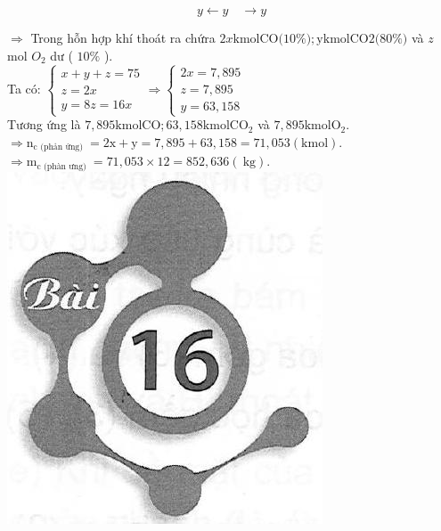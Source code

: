 \documentclass[10pt]{article}
\begin{document}
$$
y \leftarrow y \quad \rightarrow y
$$

$\Rightarrow$ Trong hỗn hợp khí thoát ra chứra $2 x \mathrm{kmol} \mathrm{CO} \mathrm{(10} \mathrm{\%);} \mathrm{y} \mathrm{kmol} \mathrm{CO2} \mathrm{(80} \mathrm{\%)}$ và $z$ mol $O_{2}$ dư ( $10 \%$ ).\\
Ta có: $\left\{\begin{array}{l}x+y+z=75 \\ z=2 x \\ y=8 z=16 x\end{array} \Rightarrow\left\{\begin{array}{l}2 x=7,895 \\ z=7,895 \\ y=63,158\end{array}\right.\right.$\\
Tương ứng là $7,895 \mathrm{kmol} \mathrm{CO} ; 63,158 \mathrm{kmol} \mathrm{CO}_{2}$ và $7,895 \mathrm{kmol} \mathrm{O}_{2}$.\\
$\Rightarrow \mathrm{n}_{\mathrm{c} \text { (phản ứng) }}=2 \mathrm{x}+\mathrm{y}=7,895+63,158=71,053(\mathrm{kmol})$.\\
$\Rightarrow \mathrm{m}_{\mathrm{c} \text { (phàn ưng) }}=71,053 \times 12=852,636(\mathrm{~kg})$.\\
\includegraphics[max width=\textwidth, center]{2025_10_23_b4e16b74380d0f7e7700g-088}
\end{document}
